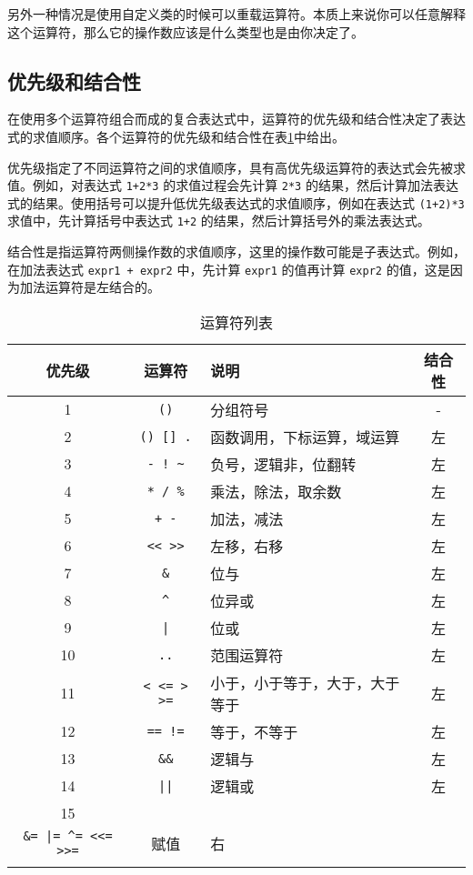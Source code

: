 另外一种情况是使用自定义类的时候可以重载运算符。本质上来说你可以任意解释这个运算符，那么它的操作数应该是什么类型也是由你决定了。

\subsection{优先级和结合性}

在使用多个运算符组合而成的复合表达式中，运算符的优先级和结合性决定了表达式的求值顺序。各个运算符的优先级和结合性在表\ref{tab::operator_list}中给出。

优先级指定了不同运算符之间的求值顺序，具有高优先级运算符的表达式会先被求值。例如，对表达式 \texttt{1+2*3} 的求值过程会先计算 \texttt{2*3} 的结果，然后计算加法表达式的结果。使用括号可以提升低优先级表达式的求值顺序，例如在表达式 \texttt{(1+2)*3} 求值中，先计算括号中表达式 \texttt{1+2} 的结果，然后计算括号外的乘法表达式。

结合性是指运算符两侧操作数的求值顺序，这里的操作数可能是子表达式。例如，在加法表达式 \texttt{expr1 + expr2} 中，先计算 \texttt{expr1} 的值再计算 \texttt{expr2} 的值，这是因为加法运算符是左结合的。

\begin{table}[htb]
    \centering
    \setlength{\tabcolsep}{3mm}
    \begin{tabular}{cclc} \Xhline{1pt}
        \textbf{优先级} & \textbf{运算符} & \textbf{说明} & \textbf{结合性} \\ \hline
        1 & \texttt{()} & 分组符号 & - \\
        2 & \texttt{() [] .} & 函数调用，下标运算，域运算 & 左 \\
        3 & \texttt{- ! \textasciitilde} & 负号，逻辑非，位翻转 & 左 \\
        4 & \texttt{* / \%} & 乘法，除法，取余数 & 左 \\
        5 & \texttt{+ -} & 加法，减法 & 左 \\
        6 & \texttt{<< >>} & 左移，右移 & 左 \\
        7 & \texttt{\&} & 位与 & 左 \\
        8 & \texttt{\textasciicircum} & 位异或 & 左 \\
        9 & \texttt{|} & 位或 & 左 \\
        10 & \texttt{..} & 范围运算符 & 左 \\
        11 & \texttt{< <= > >=} & 小于，小于等于，大于，大于等于 & 左 \\
        12 & \texttt{== !=} & 等于，不等于 & 左 \\
        13 & \texttt{\&\&} & 逻辑与 & 左 \\
        14 & \texttt{||} & 逻辑或 & 左 \\
        15 & \makecell{\texttt{= += -= *= /= \%=} \\
                       \texttt{\&= |= \textasciicircum= <<= >>=}} & 赋值 & 右 \\
        \Xhline{1pt}
    \end{tabular}
    \caption{运算符列表}
    \label{tab::operator_list}
\end{table}

